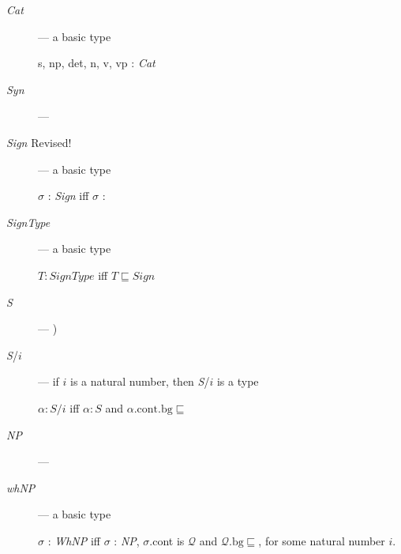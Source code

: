 \begin{description}
\begin{enumerate}
  \end{enumerate}

  
  

      
    \item[\textnormal{\textit{Cat}}] --- a basic type

      s, np, det, n, v, vp : \textit{Cat}

    
    \item[\textnormal{\textit{Syn}}] ---   
 


  
    \item[\textnormal{\textit{Sign}} Revised!] ---  a basic type

      $\sigma$ : \textit{Sign} iff $\sigma$ :

  
\item[\textnormal{\textit{SignType}}] --- a basic type

  $T:\textit{SignType}$ iff $T\sqsubseteq\textit{Sign}$ 

  
\item[\textnormal{\textit{S}}] --- 
  )
  
\item[\textnormal{\textit{S}/$i$}] --- if $i$ is a natural
  number, then \textit{S}/$i$ is a type

  $\alpha:\textit{S}/i$ iff $\alpha:\textit{S}$ and $\alpha.\text{cont}.\text{bg}\sqsubseteq$ 
  
  
\item[\textnormal{\textit{NP}}] --- 
  
\item[\textnormal{\textit{whNP}}] --- a basic type

  $\sigma$ : \textit{WhNP} iff $\sigma$ : \textit{NP}, $\sigma$.cont is $\mathcal{Q}$ and
$\mathcal{Q}.\text{bg}\sqsubseteq$, for some natural number
$i$.


\end{description}
